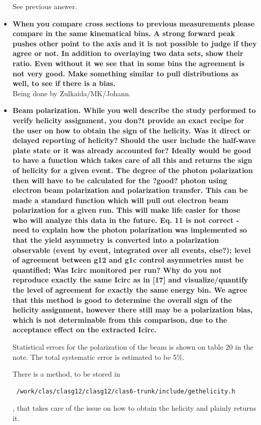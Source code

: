 \documentclass[ 12 pt]{article}
\begin{document}
\begin{itemize}
See previous answer.


\item \textbf{When you compare cross sections to previous measurements please 
compare in the same kinematical bins. A strong forward peak pushes other 
point to the axis and it is not possible to judge if they agree or not. In addition 
to overlaying two data sets, show their ratio. Even without it we see that in 
some bins the agreement is not very good. Make something similar to pull 
distributions as well, to see if there is a bias.}\\

Being done by Zulkaida/MK/Johann.


\item \textbf{Beam polarization. While you well describe the study performed to verify
helicity assignment, you don?t provide an exact recipe for the user on how to
obtain the sign of the helicity. Was it direct or delayed reporting of helicity?
Should the user include the half-wave plate state or it was already accounted
for? Ideally would be good to have a function which takes care of all this and
returns the sign of helicity for a given event. The degree of the photon
polarization then will have to be calculated for the ?good? photon using
electron beam polarization and polarization transfer. This can be made a
standard function which will pull out electron beam polarization for a given
run. This will make life easier for those who will analyze this data in the
future. Eq. 11 is not correct - need to explain how the photon polarization
was implemented so that the yield asymmetry is converted into a
polarization observable (event by event, integrated over all events, else?);
level of agreement between g12 and g1c control asymmetries must be
quantified; Was Icirc monitored per run? Why do you not reproduce exactly
the same Icirc as in [17] and visualize/quantify the level of agreement for
exactly the same energy bin. We agree that this method is good to determine
the overall sign of the helicity assignment, however there still may be a
polarization bias, which is not determinable from this comparison, due to the
acceptance effect on the extracted Icirc.}



Statistical errors for the polarization of the beam is shown on table 20 in the note. The total systematic error is estimated to be 5\%.

There is a method, to be stored in \begin{verbatim} /work/clas/clasg12/clasg12/clas6-trunk/include/gethelicity.h \end{verbatim}, 
that takes care of the issue on how to obtain the helicity and plainly returns it.



\end{itemize}
\end{document}
